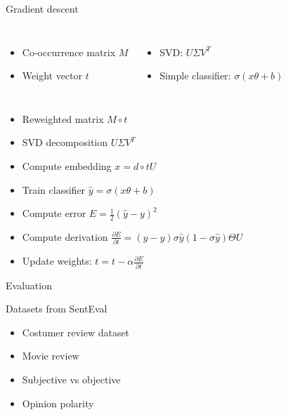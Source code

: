 \documentclass[xcolor={table}]{beamer}
\begin{document}
\begin{frame}{Gradient descent}
	\begin{columns}	
	\begin{itemize}
        \item Co-occurrence matrix $M$
        \item Weight vector $t$
	\end{itemize}
	\begin{itemize}
        \item SVD: $U \Sigma V^T$
        \item Simple classifier: $\sigma (x \theta + b)$
	\end{itemize}	
	\end{columns}

	\begin{block}{}
	\begin{itemize}
        \item Reweighted matrix $M \circ t$
        \item SVD decomposition $U \Sigma V^T$
        \item Compute embedding $x = d \circ t U$
        \item Train classifier $\hat{y} = \sigma (x \theta + b)$
        \item Compute error $E = \frac{1}{2}(\hat{y}-y)^2$
        \item Compute derivation $\frac{\partial E}{\partial t} = (\hat{y} -y) \sigma{\hat{y}} (1-\sigma{\hat{y}})\Theta U$
        \item Update weights: $t = t - \alpha \frac{\partial E}{\partial t}$
	\end{itemize}	
	\end{block}
\end{frame} 

\begin{frame}{Evaluation}
    \begin{block}{Datasets from SentEval \cite{conneau2017supervised}}
        \begin{itemize}
	        \item Costumer review dataset
	        \item Movie review
	        \item Subjective vs objective
	        \item Opinion polarity	        
        \end{itemize}
    \end{block}
    
    
\end{frame} 
\end{document}
